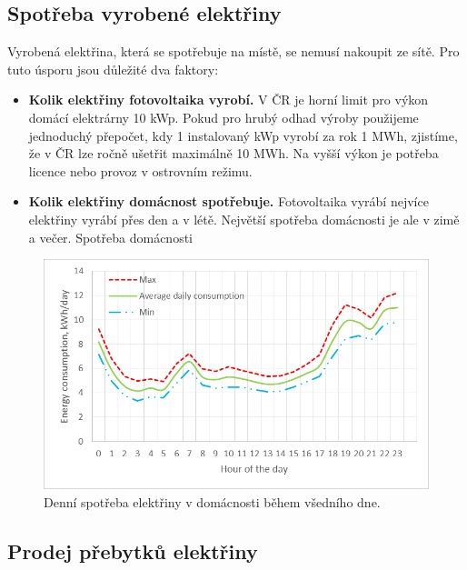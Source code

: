\subsection{Spotřeba vyrobené elektřiny}

Vyrobená elektřina, která se spotřebuje na místě, se nemusí nakoupit ze sítě.
Pro tuto úsporu jsou důležité dva faktory:

\begin{itemize}
    \item \textbf{Kolik elektřiny fotovoltaika vyrobí.} V ČR je horní limit pro výkon domácí elektrárny 10 \si{\kW}p. Pokud pro hrubý odhad výroby použijeme jednoduchý přepočet, kdy 1 instalovaný \si{\kW}p vyrobí za rok 1 MWh, zjistíme, že v ČR lze ročně ušetřit maximálně 10 MWh. Na vyšší výkon je potřeba licence nebo provoz v ostrovním režimu.
    \item \textbf{Kolik elektřiny domácnost spotřebuje.} Fotovoltaika vyrábí nejvíce elektřiny vyrábí přes den a v létě. Největší spotřeba domácnosti je ale v zimě a večer. Spotřeba domácnosti
\end{itemize}

\begin{figure}
    \includegraphics[width=\textwidth]{static/average-daily-consumption.png}
    \caption{Denní spotřeba elektřiny v domácnosti během všedního dne.} %
    \label{fig:average_daily_consumption}
\end{figure}

\subsection{Prodej přebytků elektřiny}
